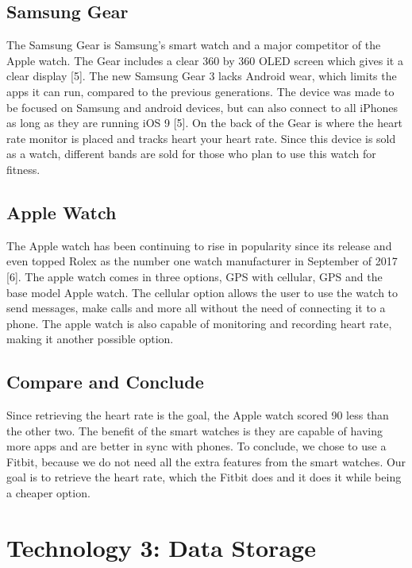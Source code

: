 \documentclass[onecolumn, draftclsnofoot,10pt, compsoc]{IEEEtran}
\begin{document}
	\subsection{Samsung Gear}	
	
		The Samsung Gear is Samsung’s smart watch and a major competitor of the Apple watch. The Gear includes a clear 360 by 360 OLED screen which gives it a clear display [5]. The new Samsung Gear 3 lacks Android wear, which limits the apps it can run, compared 
		to the previous generations. The device was made to be focused on Samsung and android devices, but can also connect to all iPhones as long as they are running iOS 9 [5]. On the back of the Gear is where the heart rate monitor is placed and tracks heart your
		heart rate. Since this device is sold as a watch, different bands are sold for those who plan to use this watch for fitness.
		
	\subsection{Apple Watch}
	
		The Apple watch has been continuing to rise in popularity since its release and even topped Rolex as the number one watch manufacturer in September of 2017 [6]. The apple watch comes in three options, GPS with cellular, GPS and the base model Apple watch. The 
		cellular option allows the user to use the watch to send messages, make calls and more all without the need of connecting it to a phone. The apple watch is also capable of monitoring and recording heart rate, making it another possible option.
		
	\subsection{Compare and Conclude}
	
		Since retrieving the heart rate is the goal, the Apple watch scored 90%
		less than the other two. The benefit of the smart watches is they are capable of having more apps and are better in sync with phones. To conclude, we chose to use a Fitbit, because we do not need all the extra features from the smart watches. Our goal is to 
		retrieve the heart rate, which the Fitbit does and it does it while being a cheaper option.
	
	
\section{Technology 3: Data Storage}
\end{document}
